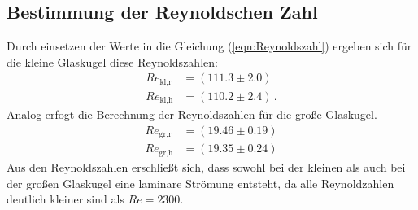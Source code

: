 \subsection{Bestimmung der Reynoldschen Zahl}
Durch einsetzen der Werte in die Gleichung (\ref{eqn:Reynoldszahl}) ergeben sich für die 
kleine Glaskugel diese Reynoldszahlen:
\begin{align*}
  Re_{\text{kl,r}} &= \left(111.3\pm2.0\right)\\
  Re_{\text{kl,h}} &= \left(110.2\pm2.4\right)\,.
\end{align*}
Analog erfogt die Berechnung der Reynoldszahlen für die große Glaskugel.
\begin{align*}
  Re_{\text{gr,r}} &= \left(19.46\pm0.19\right)\\
  Re_{\text{gr,h}} &= \left(19.35\pm0.24\right)
\end{align*}
Aus den Reynoldszahlen erschließt sich, dass sowohl bei der kleinen als auch bei der großen Glaskugel
eine laminare Strömung entsteht, da alle Reynoldzahlen deutlich kleiner sind als $Re=2300$.
%
